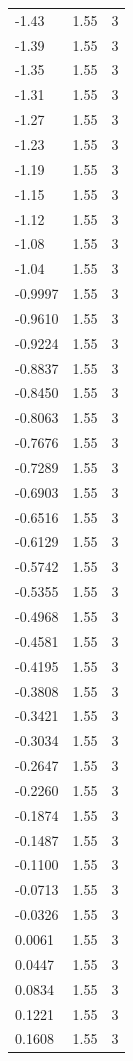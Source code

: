 \begin{longtable}{lrr}
  -1.43 & 1.55 & 3 \\
  -1.39 & 1.55 & 3 \\
  -1.35 & 1.55 & 3 \\
  -1.31 & 1.55 & 3 \\
  -1.27 & 1.55 & 3 \\
  -1.23 & 1.55 & 3 \\
  -1.19 & 1.55 & 3 \\
  -1.15 & 1.55 & 3 \\
  -1.12 & 1.55 & 3 \\
  -1.08 & 1.55 & 3 \\
  -1.04 & 1.55 & 3 \\
  -0.9997 & 1.55 & 3 \\
  -0.9610 & 1.55 & 3 \\
  -0.9224 & 1.55 & 3 \\
  -0.8837 & 1.55 & 3 \\
  -0.8450 & 1.55 & 3 \\
  -0.8063 & 1.55 & 3 \\
  -0.7676 & 1.55 & 3 \\
  -0.7289 & 1.55 & 3 \\
  -0.6903 & 1.55 & 3 \\
  -0.6516 & 1.55 & 3 \\
  -0.6129 & 1.55 & 3 \\
  -0.5742 & 1.55 & 3 \\
  -0.5355 & 1.55 & 3 \\
  -0.4968 & 1.55 & 3 \\
  -0.4581 & 1.55 & 3 \\
  -0.4195 & 1.55 & 3 \\
  -0.3808 & 1.55 & 3 \\
  -0.3421 & 1.55 & 3 \\
  -0.3034 & 1.55 & 3 \\
  -0.2647 & 1.55 & 3 \\
  -0.2260 & 1.55 & 3 \\
  -0.1874 & 1.55 & 3 \\
  -0.1487 & 1.55 & 3 \\
  -0.1100 & 1.55 & 3 \\
  -0.0713 & 1.55 & 3 \\
  -0.0326 & 1.55 & 3 \\
  0.0061 & 1.55 & 3 \\
  0.0447 & 1.55 & 3 \\
  0.0834 & 1.55 & 3 \\
  0.1221 & 1.55 & 3 \\
  0.1608 & 1.55 & 3 \\

\end{longtable}
